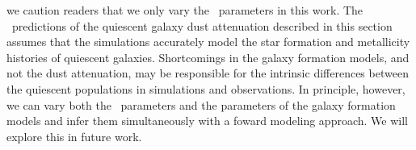 we caution readers
that we only vary the \eda~parameters in this work.     
The \eda~predictions of the quiescent galaxy dust attenuation described in this
section assumes that the simulations accurately model the star formation and
metallicity histories of quiescent galaxies. 
Shortcomings in the galaxy formation models, and not the dust attenuation, may
be responsible for the intrinsic differences between the quiescent populations
in simulations and observations. 
In principle, however, we can vary both the \eda~parameters and the parameters
of the galaxy formation models and infer them simultaneously with a foward
modeling approach. 
We will explore this in future work. 
